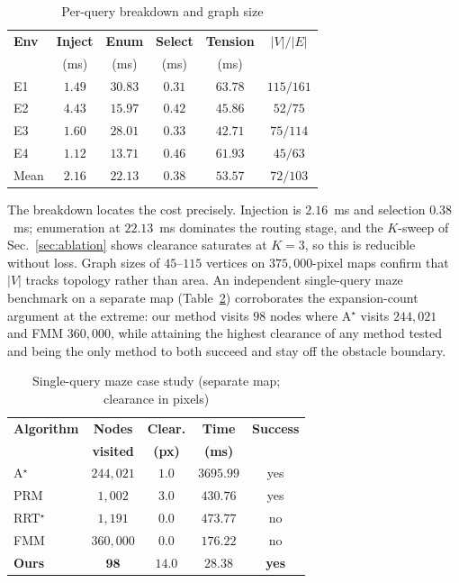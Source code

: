 \documentclass[conference]{IEEEtran}
\begin{document}
\begin{table}[htbp]
\caption{Per-query breakdown and graph size}
\label{tab:breakdown}
\begin{center}
\begin{tabular}{@{}lccccc@{}}
\toprule
\textbf{Env} & \textbf{Inject} & \textbf{Enum} & \textbf{Select} & \textbf{Tension} & \textbf{$|V|/|E|$} \\
 & (ms) & (ms) & (ms) & (ms) & \\ \midrule
E1 & $1.49$ & $30.83$ & $0.31$ & $63.78$ & $115/161$ \\
E2 & $4.43$ & $15.97$ & $0.42$ & $45.86$ & $52/75$ \\
E3 & $1.60$ & $28.01$ & $0.33$ & $42.71$ & $75/114$ \\
E4 & $1.12$ & $13.71$ & $0.46$ & $61.93$ & $45/63$ \\ \midrule
Mean & $2.16$ & $22.13$ & $0.38$ & $53.57$ & $72/103$ \\ \bottomrule
\end{tabular}
\end{center}
\end{table}
The breakdown locates the cost precisely. Injection is $2.16$~ms and selection $0.38$~ms; enumeration at $22.13$~ms dominates the routing stage, and the $K$-sweep of Sec.~\ref{sec:ablation} shows clearance saturates at $K=3$, so this is reducible without loss. Graph sizes of $45$--$115$ vertices on $375{,}000$-pixel maps confirm that $|V|$ tracks topology rather than area.
An independent single-query maze benchmark on a separate map (Table~\ref{tab:maze}) corroborates the expansion-count argument at the extreme: our method visits $98$ nodes where A$^\star$ visits $244{,}021$ and FMM $360{,}000$, while attaining the highest clearance of any method tested and being the only method to both succeed and stay off the obstacle boundary.
\begin{table}[htbp]
\caption{Single-query maze case study (separate map; clearance in pixels)}
\label{tab:maze}
\begin{center}
\begin{tabular}{@{}lcccc@{}}
\toprule
\textbf{Algorithm} & \textbf{Nodes} & \textbf{Clear.} & \textbf{Time} & \textbf{Success} \\
 & \textbf{visited} & \textbf{(px)} & \textbf{(ms)} & \\ \midrule
A$^\star$ & $244{,}021$ & $1.0$ & $3695.99$ & yes \\
PRM & $1{,}002$ & $3.0$ & $430.76$ & yes \\
RRT$^\star$ & $1{,}191$ & $0.0$ & $473.77$ & no \\
FMM & $360{,}000$ & $0.0$ & $176.22$ & no \\
\textbf{Ours} & $\mathbf{98}$ & $\mathbf{14.0}$ & $\mathbf{28.38}$ & \textbf{yes} \\ \bottomrule
\end{tabular}
\end{center}
\end{table}
\end{document}
